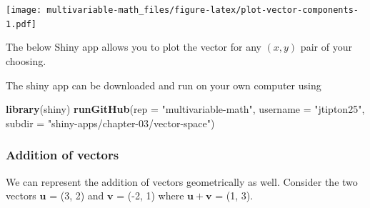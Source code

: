 \documentclass[
]{book}
\newenvironment{Shaded}{\begin{snugshade}}{\end{snugshade}}
\newcommand{\DataTypeTok}[1]{\textcolor[rgb]{0.13,0.29,0.53}{#1}}
\newcommand{\DecValTok}[1]{\textcolor[rgb]{0.00,0.00,0.81}{#1}}
\newcommand{\KeywordTok}[1]{\textcolor[rgb]{0.13,0.29,0.53}{\textbf{#1}}}
\newcommand{\NormalTok}[1]{#1}
\newcommand{\OperatorTok}[1]{\textcolor[rgb]{0.81,0.36,0.00}{\textbf{#1}}}
\newcommand{\StringTok}[1]{\textcolor[rgb]{0.31,0.60,0.02}{#1}}
\theoremstyle{definition}
\theoremstyle{definition}
\theoremstyle{definition}
\theoremstyle{definition}
\theoremstyle{remark}
\begin{document}
\texttt{[image: multivariable-math\_files/figure-latex/plot-vector-components-1.pdf]}

The below Shiny app allows you to plot the vector for any \((x, y)\) pair of your choosing.

The shiny app can be downloaded and run on your own computer using

\begin{Shaded}
\begin{Highlighting}[]
\KeywordTok{library}\NormalTok{(shiny)}
\KeywordTok{runGitHub}\NormalTok{(}\DataTypeTok{rep =} \StringTok{"multivariable-math"}\NormalTok{, }
          \DataTypeTok{username =} \StringTok{"jtipton25"}\NormalTok{,}
          \DataTypeTok{subdir =} \StringTok{"shiny-apps/chapter-03/vector-space"}\NormalTok{) }
\end{Highlighting}
\end{Shaded}

\hypertarget{addition-of-vectors}{%
\subsubsection{Addition of vectors}\label{addition-of-vectors}}

We can represent the addition of vectors geometrically as well. Consider the two vectors \(\mathbf{u}\) = (3, 2) and \(\mathbf{v}\) = (-2, 1) where \(\mathbf{u} + \mathbf{v}\) = (1, 3).

\begin{Shaded}
\end{Shaded}
\end{document}
